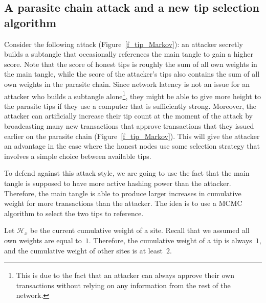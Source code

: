 \documentclass[12pt]{article}
\newcommand{\HH}{\mathcal{H}}
\begin{document}
\subsection{A parasite chain attack and a new tip 
selection algorithm}
\label{s_parasite}
Consider the following attack (Figure~\ref{f_tip_Markov}):
an attacker secretly builds a subtangle that occasionally 
references the main tangle to gain a higher score. 
Note that the score of honest tips is roughly the sum 
of all own weights in the main tangle, while the score
of the attacker's tips also contains the sum of all own weights in the
parasite chain.
Since network latency is not an issue for an attacker
 who builds a subtangle 
alone\footnote{This is due to the fact that an attacker can always
approve their own transactions without relying on any
information from the rest of the network.},
they might be able to give more height
to the parasite tips if they use a computer 
that is sufficiently strong. Moreover, the attacker can artificially 
increase their tip count at the moment of the attack by 
broadcasting many new transactions that approve 
transactions that they issued earlier on the parasite chain
(Figure~\ref{f_tip_Markov}).
This will give the attacker an advantage in the case where 
the honest nodes use some selection strategy 
that involves a simple choice between available tips.

To defend against this attack style,
we are going to use the fact that the main tangle is supposed
to have more active hashing power than the attacker. Therefore, the 
main tangle is able to produce larger increases in cumulative weight 
for more transactions than the attacker.  
The idea is to use a MCMC algorithm
to select the two tips to reference. 

Let $\HH_x$ be the current cumulative weight of a site.
 Recall that we assumed all 
own weights are equal to~$1$. Therefore, the cumulative weight of a tip
is always~$1$, and the cumulative weight of other sites is at least~$2$.
\end{document}
